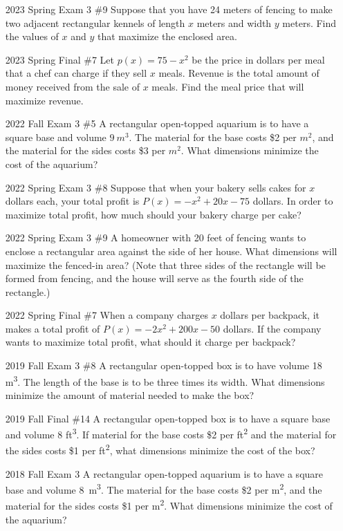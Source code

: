 \documentclass[10pt]{scrartcl}
\theoremstyle{definition}
\begin{document}
\begin{enumerate}
\item [2023 Spring Exam 3 \#9] Suppose that you have 24 meters of fencing to make two adjacent rectangular kennels of length $x$ meters and width $y$ meters. Find the values of $x$ and $y$ that maximize the enclosed area.
\item [2023 Spring Final \#7] Let $p(x) = 75-x^2$ be the price in dollars per meal that a chef can charge if they sell $x$ meals. Revenue is the total amount of money received from the sale of $x$ meals. Find the meal price that will maximize revenue.
\item [2022 Fall Exam 3 \#5] A rectangular open-topped aquarium is to have a square base and volume $\SI{9}{m^3}$. The material for the base costs \$2 per $\unit{m^2}$, and the material for the sides costs \$3 per $\unit{m^2}$. What dimensions minimize the cost of the aquarium?
\item [2022 Spring Exam 3 \#8] Suppose that when your bakery sells cakes for $x$ dollars each, your total profit is $P(x) = -x^2+20x-75$ dollars. In order to maximize total profit, how much should your bakery charge per cake?
\item [2022 Spring Exam 3 \#9] A homeowner with 20 feet of fencing wants to enclose a rectangular area against the side of her house. What dimensions will maximize the fenced-in area? (Note that three sides of the rectangle will be formed from fencing, and the house will serve as the fourth side of the rectangle.)
\item [2022 Spring Final \#7] When a company charges $x$ dollars per backpack, it makes a total profit of $P(x) = -2x^2+200x-50$ dollars. If the company wants to maximize total profit, what should it charge per backpack?
\item [2019 Fall Exam 3 \#8] A rectangular open-topped box is to have volume 18 \unit{m^3}. The length of the base is to be three times its width. What dimensions minimize the amount of material needed to make the box?
\item [2019 Fall Final \#14] A rectangular open-topped box is to have a square base and volume 8 \unit{ft^3}. If material for the base costs \$2 per \si{ft^2} and the material for the sides costs \$1 per \si{ft^2}, what dimensions minimize the cost of the box?
\item [2018 Fall Exam 3] A rectangular open-topped aquarium is to have a square base and volume \SI{8}{m^3}. The material for the base costs \$2 per \si{m^2}, and the material for the sides costs \$1 per \si{m^2}. What dimensions minimize the cost of the aquarium?

\end{enumerate}
\end{document}

